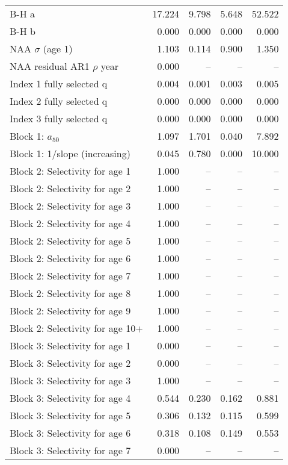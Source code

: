 \documentclass[
]{article}
\begin{document}
\begin{landscape}
\begin{longtable}[t]{lrrrr}
\endfoot
\bottomrule
\endlastfoot
B-H a & 17.224 & 9.798 & 5.648 & 52.522\\
B-H b & 0.000 & 0.000 & 0.000 & 0.000\\
NAA $\sigma$ (age 1) & 1.103 & 0.114 & 0.900 & 1.350\\
NAA residual AR1 $\rho$ year & 0.000 & -- & -- & --\\
Index 1 fully selected q & 0.004 & 0.001 & 0.003 & 0.005\\
\addlinespace
Index 2 fully selected q & 0.000 & 0.000 & 0.000 & 0.000\\
Index 3 fully selected q & 0.000 & 0.000 & 0.000 & 0.000\\
Block 1: $a_{50}$ & 1.097 & 1.701 & 0.040 & 7.892\\
Block 1: 1/slope (increasing) & 0.045 & 0.780 & 0.000 & 10.000\\
Block 2: Selectivity for age 1 & 1.000 & -- & -- & --\\
\addlinespace
Block 2: Selectivity for age 2 & 1.000 & -- & -- & --\\
Block 2: Selectivity for age 3 & 1.000 & -- & -- & --\\
Block 2: Selectivity for age 4 & 1.000 & -- & -- & --\\
Block 2: Selectivity for age 5 & 1.000 & -- & -- & --\\
Block 2: Selectivity for age 6 & 1.000 & -- & -- & --\\
\addlinespace
Block 2: Selectivity for age 7 & 1.000 & -- & -- & --\\
Block 2: Selectivity for age 8 & 1.000 & -- & -- & --\\
Block 2: Selectivity for age 9 & 1.000 & -- & -- & --\\
Block 2: Selectivity for age 10+ & 1.000 & -- & -- & --\\
Block 3: Selectivity for age 1 & 0.000 & -- & -- & --\\
\addlinespace
Block 3: Selectivity for age 2 & 0.000 & -- & -- & --\\
Block 3: Selectivity for age 3 & 1.000 & -- & -- & --\\
Block 3: Selectivity for age 4 & 0.544 & 0.230 & 0.162 & 0.881\\
Block 3: Selectivity for age 5 & 0.306 & 0.132 & 0.115 & 0.599\\
Block 3: Selectivity for age 6 & 0.318 & 0.108 & 0.149 & 0.553\\
\addlinespace
Block 3: Selectivity for age 7 & 0.000 & -- & -- & --\\

\end{longtable}
\end{landscape}
\end{document}
